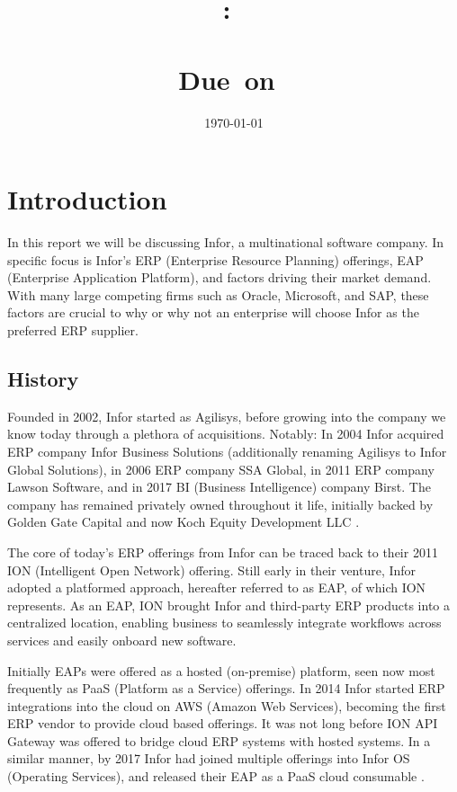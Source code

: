 \documentclass{article}
\title{
    \vspace{2in}
    \textmd{\textbf{\hmwkClass:\ \\ \hmwkTitle}}\\
    \normalsize\vspace{0.1in}\small{Due\ on\ \hmwkDueDate}\\
    \vspace{0.1in}\Large{\textit{\paprTitle}}
    \vspace{3in}
}
\author{\hmwkAuthorName}
\date{\today}
\begin{document}
\maketitle

\pagebreak

\tableofcontents
\listoftables
\listoffigures
\newpage


\section{Introduction}
In this report we will be discussing Infor, a multinational software company.
In specific focus is Infor's ERP (Enterprise Resource Planning) offerings, EAP (Enterprise Application Platform), and factors driving their market demand.
With many large competing firms such as Oracle, Microsoft, and SAP, these factors are crucial to why or why not an enterprise will choose Infor as the preferred ERP supplier.

\subsection{History}

Founded in 2002, Infor started as Agilisys, before growing into the company we know today through a plethora of acquisitions.
Notably: In 2004 Infor acquired ERP company Infor Business Solutions (additionally renaming Agilisys to Infor Global Solutions), in 2006 ERP company SSA Global, in 2011 ERP company Lawson Software, and in 2017 BI (Business Intelligence) company Birst.
The company has remained privately owned throughout it life, initially backed by Golden Gate Capital and now Koch Equity Development LLC \cite{wikipedia_infor}.

The core of today's ERP offerings from Infor can be traced back to their 2011 ION (Intelligent Open Network) offering.
Still early in their venture, Infor adopted a platformed approach, hereafter referred to as EAP, of which ION represents.
As an EAP, ION brought Infor and third-party ERP products into a centralized location, enabling business to seamlessly integrate workflows across services and easily onboard new software.

Initially EAPs were offered as a hosted (on-premise) platform, seen now most frequently as PaaS (Platform as a Service) offerings.
In 2014 Infor started ERP integrations into the cloud on AWS (Amazon Web Services), becoming the first ERP vendor to provide cloud based offerings.
It was not long before ION API Gateway was offered to bridge cloud ERP systems with hosted systems.
In a similar manner, by 2017 Infor had joined multiple offerings into Infor OS (Operating Services), and released their EAP as a PaaS cloud consumable \cite{infor_os_next_gen}.
\end{document}
